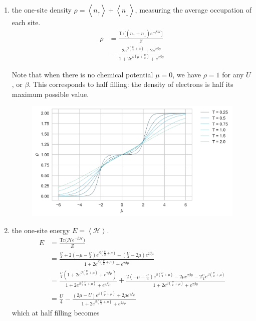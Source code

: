 \begin{enumerate}
\item the one-site density $\rho = \left\langle n_\uparrow \right\rangle + \left\langle n_\downarrow \right\rangle$, measuring the average occupation of each site.
\begin{equation}
\begin{split}
\rho &= \frac{\text{Tr} \big[ (n_\uparrow + n_\downarrow ) e^{-\beta\mathcal{H}} \big]}{Z} \\
&= \frac{2 e^{\beta(\frac{U}{2} + \mu)} + 2 e^{2\beta\mu}}{1 + 2 e^{\beta(\mu + \frac{U}{2})} + e^{2 \beta \mu}}
\end{split}
\end{equation}

Note that when there is no chemical potential $\mu = 0$, we have $\rho = 1$ for any $U$, or $\beta$. This corresponds to half filling: the density of electrons is half its maximum possible value.

\begin{figure}[H]
	\centering
\hspace{12mm}\includegraphics[width=0.83\linewidth]{Figures/HubbardModel/rhoVsMu.png}
	\caption[]{}
	\label{fig:rhoVsMu}
\end{figure}

\item the one-site energy $E = \left\langle \mathcal{H} \right\rangle$.
\begin{equation}
\begin{split}
E &= \frac{\text{Tr}\bigg( \mathcal{H}e^{-\beta\mathcal{H} } \bigg)}{Z} \\
&= \frac{ \frac{U}{4} + 2 ( -\mu - \frac{U}{4} ) e^{\beta(\frac{U}{2} + \mu )} + (\frac{U}{4} - 2\mu ) e^{2\beta\mu}}{1 + 2 e^{\beta (\frac{U}{2} + \mu )} + e^{2\beta\mu} } \\
&= \frac{ \frac{U}{4} ( 1 + 2 e^{\beta (\frac{U}{2} + \mu )} + e^{2\beta\mu} )}{1 + 2 e^{\beta (\frac{U}{2} + \mu )} + e^{2\beta\mu} } + \frac{2(-\mu - \frac{U}{4}) e^{\beta(\frac{U}{2} + \mu)} - 2\mu e^{2\beta\mu} - 2\frac{U}{4} e^{\beta (\frac{U}{2} + \mu)} }{1 + 2 e^{\beta (\frac{U}{2} + \mu )} + e^{2\beta\mu}} \\
&= \frac{U}{4} - \frac{ (2\mu - U) e^{\beta(\frac{U}{2} + \mu) } + 2\mu e^{2\beta\mu} }{1 + 2 e^{\beta (\frac{U}{2} + \mu )} + e^{2\beta\mu} }
\end{split}
\end{equation}
which at half filling becomes


\end{enumerate}
